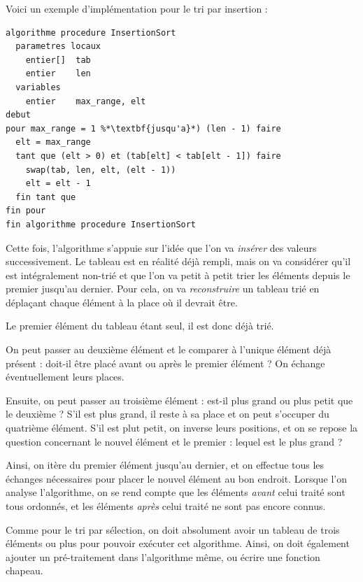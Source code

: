 \documentclass[11pt,a4paper]{article}
\begin{document}
\vfillFirst
\vfillLast

Voici un exemple d'implémentation pour le tri par insertion :

\bigskip

\begin{table}[ht!]
  \centering
\begin{lstlisting}[style=algorithmique]
algorithme procedure InsertionSort
  parametres locaux
    entier[]  tab
    entier    len
  variables
    entier    max_range, elt
debut
pour max_range = 1 %*\textbf{jusqu'a}*) (len - 1) faire
  elt = max_range
  tant que (elt > 0) et (tab[elt] < tab[elt - 1]) faire
    swap(tab, len, elt, (elt - 1))
    elt = elt - 1
  fin tant que
fin pour
fin algorithme procedure InsertionSort \end{lstlisting}
\end{table}


Cette fois, l'algorithme s'appuie sur l'idée que l'on va \textit{insérer} des valeurs successivement.
Le tableau est en réalité déjà rempli, mais on va considérer qu'il est intégralement non-trié et que l'on va petit à petit trier les éléments depuis le premier jusqu'au dernier.
Pour cela, on va \textit{reconstruire} un tableau trié en déplaçant chaque élément à la place où il devrait être.

\clearpage

Le premier élément du tableau étant seul, il est donc déjà trié.

On peut passer au deuxième élément et le comparer à l'unique élément déjà présent : doit-il être placé avant ou après le premier élément ?
On échange éventuellement leurs places.

Ensuite, on peut passer au troisième élément : est-il plus grand ou plus petit que le deuxième ?
S'il est plus grand, il reste à sa place et on peut s'occuper du quatrième élément.
S'il est plut petit, on inverse leurs positions, et on se repose la question concernant le nouvel élément et le premier : lequel est le plus grand ?

Ainsi, on itère du premier élément jusqu'au dernier, et on effectue tous les échanges nécessaires pour placer le nouvel élément au bon endroit.
Lorsque l'on analyse l'algorithme, on se rend compte que les éléments \textit{avant} celui traité sont tous ordonnés, et les éléments \textit{après} celui traité ne sont pas encore connus.

\medskip

Comme pour le tri par sélection, on doit absolument avoir un tableau de trois éléments ou plus pour pouvoir exécuter cet algorithme.
Ainsi, on doit également ajouter un pré-traitement dans l'algorithme même, ou écrire une fonction chapeau.
\end{document}
